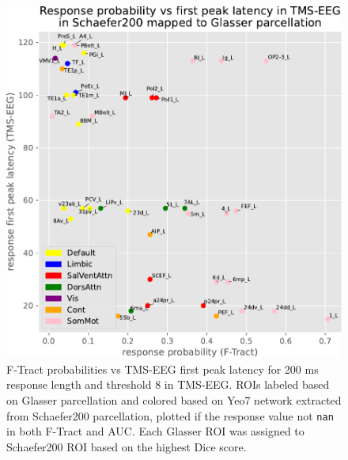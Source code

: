 \begin{figure}
  \begin{center}
    \includegraphics[width=\textwidth]{images/nootebook_generated/tmseeg_ftract_responses_comparison/FP/Response_probability_vs_first_peak_latency_in_TMS-EEG_in_Schaefer200_mapped_to_Glasser_parcellation.pdf}
  \end{center}
  \caption[F-Tract probabilities vs TMS-EEG first peak latency]{F-Tract probabilities vs TMS-EEG first peak latency for 200 ms response length and threshold 8 in TMS-EEG. ROIs labeled based on Glasser parcellation and colored based on Yeo7 network extracted from Schaefer200 parcellation, plotted if the response value not \texttt{nan} in both F-Tract and AUC. Each Glasser ROI was assigned to Schaefer200 ROI based on the highest Dice score.}
  \label{response_tmsFP-ftract_scatter}
\end{figure}